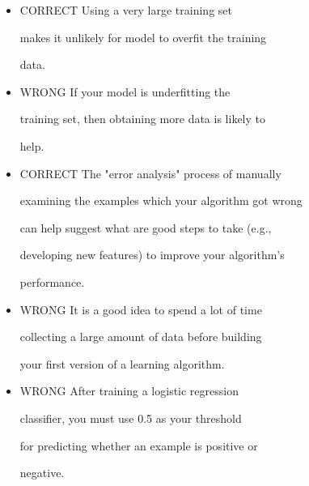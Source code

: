 \documentclass[11pt]{article} %
\begin{document}
\begin{itemize}
\item CORRECT Using a very large training set
	
	makes it unlikely for model to overfit the training
	
	data.
	
	
\item 	WRONG If your model is underfitting the
	
	training set, then obtaining more data is likely to
	
	help.
	
\item 	CORRECT The "error analysis" process of manually
	
	examining the examples which your algorithm got wrong
	
	can help suggest what are good steps to take (e.g.,
	
	developing new features) to improve your algorithm's
	
	performance.
	
	
	
\item	WRONG It is a good idea to spend a lot of time
	
	collecting a large amount of data before building
	
	your first version of a learning algorithm.
	
	
	
\item WRONG After training a logistic regression
	
	classifier, you must use 0.5 as your threshold
	
	for predicting whether an example is positive or
	
	negative.
\end{itemize}
\end{document}
